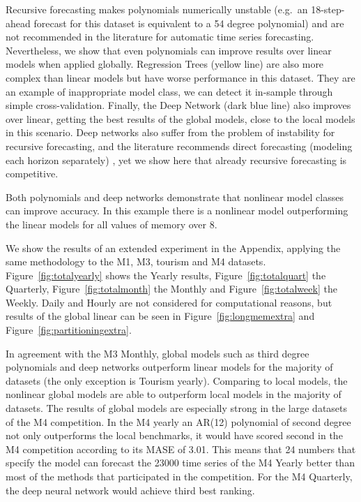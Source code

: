 \documentclass[a4paper]{article}
\theoremstyle{custom}
\begin{document}
Recursive forecasting makes polynomials numerically unstable (e.g.\ an 18-step-ahead forecast for this dataset is equivalent to a 54 degree polynomial) and are not recommended in the literature for automatic time series forecasting. Nevertheless, we show that even polynomials can improve results over linear models when applied globally. Regression Trees (yellow line) are also more complex than linear models but have worse performance in this dataset. They are an example of inappropriate model class, we can detect it in-sample through simple cross-validation. Finally, the Deep Network (dark blue line) also improves over linear, getting the best results of the global models, close to the local models in this scenario. Deep networks also suffer from the problem of instability for recursive forecasting, and the literature recommends direct forecasting (modeling each horizon separately) \cite{taieb2012review}, yet we show here that already recursive forecasting is competitive.

Both polynomials and deep networks demonstrate that nonlinear model classes can improve accuracy.
In this example there is a nonlinear model outperforming the linear models for all values of memory over 8.

We show the results of an extended experiment in the Appendix, applying the same methodology to the M1, M3, tourism and M4 datasets.
Figure~\ref{fig:totalyearly} shows the Yearly results, Figure~\ref{fig:totalquart} the Quarterly, Figure~\ref{fig:totalmonth} the Monthly and Figure~\ref{fig:totalweek} the Weekly. Daily and Hourly are not considered for computational reasons, but results of the global linear can be seen in Figure~\ref{fig:longmemextra} and Figure~\ref{fig:partitioningextra}.

In agreement with the M3 Monthly, global models such as third degree polynomials and deep networks outperform linear models for the majority of datasets (the only exception is Tourism yearly).
Comparing to local models, the nonlinear global models are able to outperform local models in the majority of datasets. The results of global models are especially strong in the large datasets of the M4 competition. In the M4 yearly an AR(12) polynomial of second degree not only outperforms the local benchmarks, it would have scored second in the M4 competition according to its MASE of 3.01.
This means that 24 numbers that specify the model can forecast the 23000 time series of the M4 Yearly better than most of the methods that participated in the competition. For the M4 Quarterly, the deep neural network would achieve third best ranking.
\end{document}
